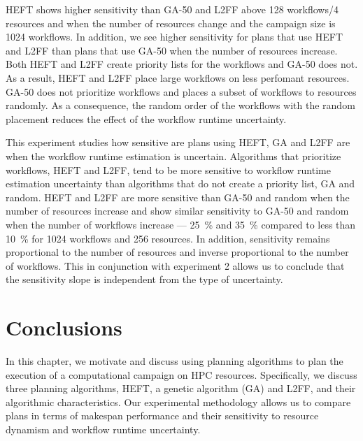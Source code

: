 HEFT shows higher sensitivity than GA-50 and L2FF above 128 workflows/4 resources and when the number of resources change and the campaign size is 1024 workflows.
In addition, we see higher sensitivity for plans that use HEFT and L2FF than plans that use GA-50 when the number of resources increase.
Both HEFT and L2FF create priority lists for the workflows and GA-50 does not.
As a result, HEFT and L2FF place large workflows on less perfomant resources.
GA-50 does not prioritize workflows and places a subset of workflows to resources randomly.
As a consequence, the random order of the workflows with the random placement reduces the effect of the workflow runtime uncertainty.

This experiment studies how sensitive are plans using HEFT, GA and L2FF are when the workflow runtime estimation is uncertain.
Algorithms that prioritize workflows, HEFT and L2FF, tend to be more sensitive to workflow runtime estimation uncertainty than algorithms that do not create a priority list, GA and random.
HEFT and L2FF are more sensitive than GA-50 and random when the number of resources increase and show similar sensitivity to GA-50 and random when the number of workflows increase --- 25~\% and 35~\% compared to less than 10~\% for 1024 workflows and 256 resources.
In addition, sensitivity remains proportional to the number of resources and inverse proportional to the number of workflows.
This in conjunction with experiment 2 allows us to conclude that the sensitivity slope is independent from the type of uncertainty.


\section{Conclusions}
\label{sec:cf_algo_sel}
In this chapter, we motivate and discuss using planning algorithms to plan the execution of a computational campaign on HPC resources.
Specifically, we discuss three planning algorithms, HEFT, a genetic algorithm (GA) and L2FF, and their algorithmic characteristics.
Our experimental methodology allows us to compare plans in terms of makespan performance and their sensitivity to resource dynamism and workflow runtime uncertainty.

